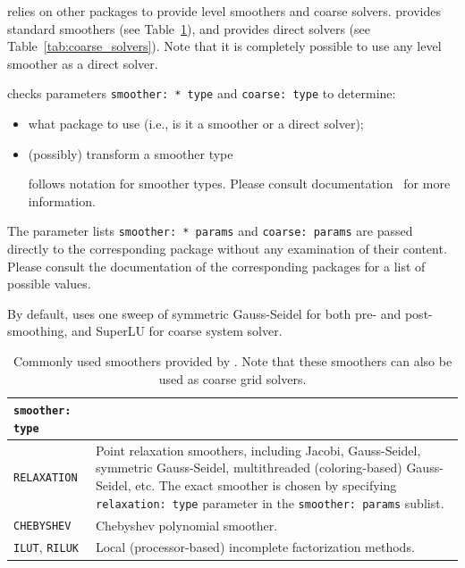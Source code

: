 \muelu{} relies on other \trilinos{} packages to provide level smoothers and
coarse solvers. \ifpacktwo{} provides standard smoothers (see
Table~\ref{tab:smoothers}), and \amesostwo{} provides direct
solvers (see Table~\ref{tab:coarse_solvers}). Note that it is completely possible to use
any level smoother as a direct solver.

\muelu{} checks parameters \verb|smoother: * type| and \verb|coarse: type| to
determine:
\begin{itemize}
  \item what package to use (i.e., is it a smoother or a direct solver);
  \item (possibly) transform a smoother type

     \muelu{} follows \ifpacktwo{} notation for smoother types.
    Please consult \ifpacktwo{} documentation~\cite{Ifpack2} for more information.
\end{itemize}
The parameter lists \verb|smoother: * params| and \verb|coarse: params| are
passed directly to the corresponding package without any examination of their
content. Please consult the documentation of the corresponding packages for a list of
possible values.

By default, \muelu{} uses one sweep of symmetric Gauss-Seidel for both pre- and
post-smoothing, and SuperLU for coarse system solver.

\begin{table}[tbh]
  \begin{center}
    \begin{tabular}{p{4.0cm} p{10cm}}
      \toprule
      \texttt{smoother: type}           & \\
      \midrule
      \verb|RELAXATION|                 & Point relaxation smoothers, including
                                          Jacobi, Gauss-Seidel, symmetric Gauss-Seidel,
                                          multithreaded (coloring-based) Gauss-Seidel, etc. The exact
                                          smoother is chosen by specifying \texttt{relaxation: type} parameter in
                                          the \texttt{smoother: params} sublist. \\
      \verb|CHEBYSHEV|                  & Chebyshev polynomial smoother. \\
      \verb|ILUT|, \verb|RILUK|         & Local (processor-based) incomplete factorization methods. \\
      \bottomrule
    \end{tabular}
    \caption{Commonly used smoothers provided by \ifpacktwo{}. Note
    that these smoothers can also be used as coarse grid solvers.}
\label{tab:smoothers}
  \end{center}
\end{table}

